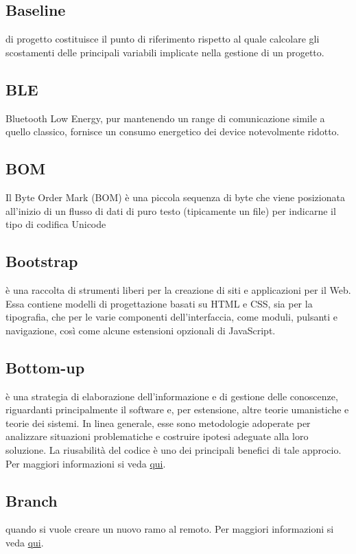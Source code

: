 \documentclass[12pt,a4paper]{article}
\begin{document}
\subsection{Baseline}
 di progetto costituisce il punto di riferimento rispetto al quale calcolare gli scostamenti delle principali variabili implicate nella gestione di un progetto.

\subsection{BLE}
 Bluetooth Low Energy,  pur mantenendo un range di comunicazione simile a quello classico, fornisce un  consumo energetico dei device notevolmente ridotto.
 
 \subsection{BOM}
 Il Byte Order Mark (BOM) è una piccola sequenza di byte che viene posizionata all'inizio di un flusso di dati di puro testo (tipicamente un file) per indicarne il tipo di codifica Unicode

\subsection{Bootstrap}
è una raccolta di strumenti liberi per la creazione di siti e applicazioni per il Web. Essa contiene modelli di progettazione basati su HTML e CSS, sia per la tipografia, che per le varie componenti dell'interfaccia, come moduli, pulsanti e navigazione, così come alcune estensioni opzionali di JavaScript. 

\subsection{Bottom-up}
è una strategia di elaborazione dell'informazione e di gestione delle conoscenze, riguardanti principalmente il software e, per estensione, altre teorie umanistiche e teorie dei sistemi. In linea generale, esse sono metodologie adoperate per analizzare situazioni problematiche e costruire ipotesi adeguate alla loro soluzione. La riusabilità del codice è uno dei principali benefici di tale approcio. Per maggiori informazioni si veda \href{https://it.wikipedia.org/wiki/Progettazione_top-down_e_bottom-up}{qui}.

\subsection{Branch}
 quando si vuole creare un nuovo ramo al  remoto. Per maggiori informazioni si veda \href{https://git-scm.com/docs/}{qui}.
\end{document}
